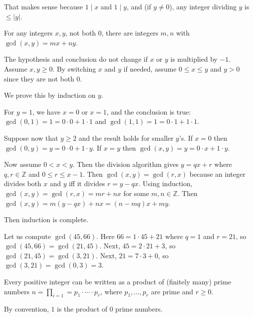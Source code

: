 \documentclass{notes}
\begin{document}
That makes sense because $1 \mid x$ and $1 \mid y$, and (if $y \neq 0$), any integer dividing $y$ is $\leq \left | y \right |$.

\begin{thm}
  For any integers $x, y$, not both $0$, there are integers $m, n$ with $\gcd(x, y) = m x + n y$.
\end{thm}

\begin{prf}
  The hypothesis and conclusion do not change if $x$ or $y$ is multiplied by $-1$.
  Assume $x, y \geq 0$.
  By switching $x$ and $y$ if needed, assume $0 \leq x \leq y$ and $y > 0$ since they are not both $0$.

  We prove this by induction on $y$.

  For $y = 1$, we have $x = 0$ or $x = 1$, and the conclusion is true: $\gcd(0, 1) = 1 = 0 \cdot 0 + 1 \cdot 1$ and $\gcd(1, 1) = 1 = 0 \cdot 1 + 1 \cdot 1$.

  Suppose now that $y \geq 2$ and the result holds for smaller $y$'s.
  If $x = 0$ then $\gcd(0, y) = y = 0 \cdot 0 + 1 \cdot y$.
  If $x = y$ then $\gcd(x, y) = y = 0 \cdot x + 1 \cdot y$.

  Now assume $0 < x < y$.
  Then the division algorithm gives $y = q x + r$ where $q, r \in \mathbb Z$ and $0 \leq r \leq x - 1$.
  Then $\gcd(x, y) = \gcd(r, x)$ because an integer divides both $x$ and $y$ iff it divides $r = y - q x$.
  Using induction, $\gcd(x, y) = \gcd(r, x) = m r + n x$ for some $m, n \in \mathbb Z$.
  Then $\gcd(x, y) = m (y - q x) + n x = (n - m q) x + m y$.

  Then induction is complete.
\end{prf}

\underline{}

Let us compute $\gcd(45, 66)$.
Here $66 = 1 \cdot 45 + 21$ where $q = 1$ and $r = 21$, so $\gcd(45, 66) = \gcd(21, 45)$.
Next, $45 = 2 \cdot 21 + 3$, so $\gcd(21, 45) = \gcd(3, 21)$.
Next, $21 = 7 \cdot 3 + 0$, so $\gcd(3, 21) = \gcd(0, 3) = 3$.

\begin{thm}
  Every positive integer can be written as a product of (finitely many) prime numbers $n = \prod_{i = 1} = p_1 \cdot \cdots \cdot p_r$, where $p_1, \dots, p_r$ are prime and $r \geq 0$.
\end{thm}

\begin{note}
  By convention, $1$ is the product of $0$ prime numbers.
\end{note}
\end{document}
